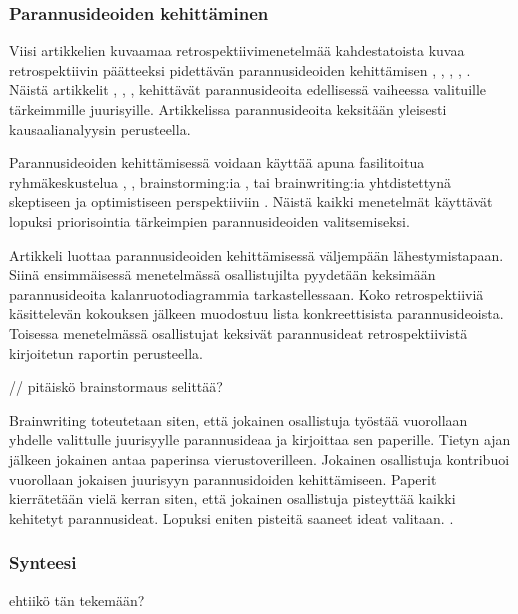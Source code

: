 \subsubsection{Parannusideoiden kehittäminen}

Viisi artikkelien kuvaamaa retrospektiivimenetelmää kahdestatoista kuvaa retrospektiivin päätteeksi pidettävän parannusideoiden kehittämisen \citep{card1998learning}, \citep{staalhane2003post}, \citep{staalhane2004root}, \citep{karlsson2006case}, \citep{Lehtinen2011}. Näistä artikkelit \citep{card1998learning}, \citep{staalhane2004root}, \citep{karlsson2006case}, \citep{Lehtinen2011} kehittävät parannusideoita edellisessä vaiheessa valituille tärkeimmille juurisyille. Artikkelissa \citep{staalhane2003post} parannusideoita keksitään yleisesti kausaalianalyysin perusteella.

Parannusideoiden kehittämisessä voidaan käyttää apuna fasilitoitua ryhmäkeskustelua \citep{card1998learning}, \citep{karlsson2006case}, brainstorming:ia \citep{staalhane2004root}, tai brainwriting:ia yhtdistettynä skeptiseen ja optimistiseen perspektiiviin \citep{Lehtinen2011}. Näistä kaikki menetelmät käyttävät lopuksi priorisointia tärkeimpien parannusideoiden valitsemiseksi. 

Artikkeli \citep{staalhane2003post} luottaa parannusideoiden kehittämisessä väljempään lähestymistapaan. Siinä ensimmäisessä menetelmässä osallistujilta pyydetään keksimään parannusideoita kalanruotodiagrammia tarkastellessaan. Koko retrospektiiviä käsittelevän kokouksen jälkeen muodostuu lista konkreettisista parannusideoista. Toisessa menetelmässä osallistujat keksivät parannusideat retrospektiivistä kirjoitetun raportin perusteella. \citep{staalhane2003post}

// pitäiskö brainstormaus selittää?

Brainwriting toteutetaan siten, että jokainen osallistuja työstää vuorollaan yhdelle valittulle juurisyylle parannusideaa ja kirjoittaa sen paperille. Tietyn ajan jälkeen jokainen antaa paperinsa vierustoverilleen. Jokainen osallistuja kontribuoi vuorollaan jokaisen juurisyyn parannusidoiden kehittämiseen. Paperit kierrätetään vielä kerran siten, että jokainen osallistuja pisteyttää kaikki kehitetyt parannusideat. Lopuksi eniten pisteitä saaneet ideat valitaan. \citep{Lehtinen2011}.


\subsubsection{Synteesi}
ehtiikö tän tekemään?

